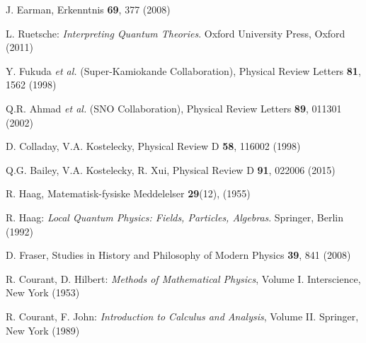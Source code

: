 \documentclass[final,3p,times,twocolumn]{elsarticle3}
\begin{document}
\begin{thebibliography}{88}
J. Earman, Erkenntnis {\bf 69}, 377 (2008)

L. Ruetsche: {\it Interpreting Quantum Theories}. Oxford University Press,
Oxford (2011)

Y. Fukuda {\it et al.} (Super-Kamiokande Collaboration), 
Physical Review Letters {\bf 81}, 1562 (1998)

Q.R. Ahmad {\it et al.} (SNO Collaboration),
Physical Review Letters {\bf 89}, 011301 (2002)

D. Colladay, V.A. Kostelecky,
Physical Review D {\bf 58}, 116002 (1998)

Q.G. Bailey, V.A. Kostelecky, R. Xui,
Physical Review D {\bf 91}, 022006 (2015)

R. Haag, Matematisk-fysiske Meddelelser {\bf 29}(12), (1955)

R. Haag: {\it Local Quantum Physics: Fields, Particles, Algebras}.
Springer, Berlin (1992)

D. Fraser, 
Studies in History and Philosophy of Modern Physics {\bf 39}, 841 (2008)

R. Courant, D. Hilbert: {\it Methods of Mathematical Physics}, Volume I.
Interscience, New York (1953) %

R. Courant, F. John: {\it Introduction to Calculus and Analysis}, Volume II.
Springer, New York (1989) %

\end{thebibliography}
\end{document}
